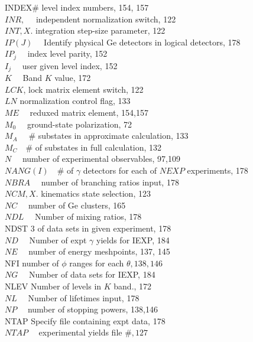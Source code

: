 \documentclass[10pt]{article}
\begin{document}
INDEX\# level index numbers, 154, 157\\
$I N R, \quad$ independent normalization switch, 122\\
$I N T, X$. integration step-size parameter, 122\\
$I P(J) \quad$ Identify physical Ge detectors in logical detectors, 178\\
$I P_{j} \quad$ index level parity, 152\\
$I_{j} \quad$ user given level index, 152\\
$K \quad$ Band $K$ value, 172\\
$L C K$, lock matrix element switch, 122\\
$L N$ normalization control flag, 133\\
$M E \quad$ reduxed matrix element, 154,157\\
$M_{0} \quad$ ground-state polarization, 72\\
$M_{A} \quad$ \# substates in approximate calculation, 133\\
$M_{C} \quad \#$ of substates in full calculation, 132\\
$N \quad$ number of experimental observables, 97,109\\
$N A N G(I) \quad \#$ of $\gamma$ detectors for each of $N E X P$ experiments, 178\\
$N B R A \quad$ number of branching ratios input, 178\\
$N C M, X$. kinematics state selection, 123\\
$N C \quad$ number of Ge clusters, 165\\
$N D L \quad$ Number of mixing ratios, 178\\
NDST 3 of data sets in given experiment, 178\\
$N D \quad$ Number of expt $\gamma$ yields for IEXP, 184\\
$N E \quad$ number of energy meshpoints, 137, 145\\
NFI number of $\phi$ ranges for each $\theta, 138,146$\\
$N G \quad$ Number of data sets for IEXP, 184\\
NLEV Number of levels in $K$ band., 172\\
$N L \quad$ Number of lifetimes input, 178\\
$N P \quad$ number of stopping powers, 138,146\\
NTAP Specify file containing expt data, 178\\
$N T A P \quad$ experimental yields file $\#, 127$\\
\end{document}
